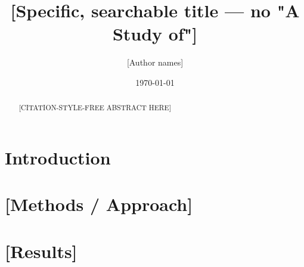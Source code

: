 \documentclass[11pt]{article}
\title{[Specific, searchable title — no "A Study of"]}
\author{[Author names]}
\date{\today}
\begin{document}
\maketitle

\begin{abstract}
[CITATION-STYLE-FREE ABSTRACT HERE]
\end{abstract}

\section{Introduction}
\label{sec:intro}

\section{[Methods / Approach]}
\label{sec:methods}

\section{[Results]}
\label{sec:results}


\end{document}
